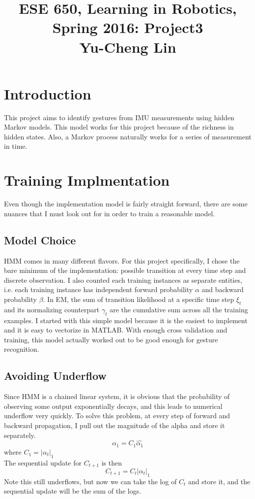 \documentclass[english]{article}
\title{ESE 650, Learning in Robotics, Spring 2016: Project3 \\
Yu-Cheng Lin}
\date{}
\begin{document}
\maketitle
\section*{Introduction}
This project aims to identify gestures from IMU measurements using hidden Markov models. This model works for this project because of the richness in hidden states. Also, a Markov process naturally works for a series of measurement in time.
\section*{Training Implmentation}
Even though the implementation model is fairly straight forward, there are some nuances that I must look out for in order to train a reasonable model.
\subsection{Model Choice}
HMM comes in many different flavors. For this project specifically, I chose the bare minimum of the implementation: possible transition at every time step and discrete observation. I also counted each training instances as separate entities, i.e. each training instance has independent forward probability $\alpha$ and backward probability $\beta$. In EM, the sum of transition likelihood at a specific time step $\xi_t$ and its normalizing counterpart $\gamma_t$ are the cumulative sum across all the training examples. I started with this simple model because it is the easiest to implement and it is easy to vectorize in MATLAB. With enough cross validation and training, this model actually worked out to be good enough for gesture recognition.
\subsection{Avoiding Underflow}
Since HMM is a chained linear system, it is obvious that the probability of observing some output exponentially decays, and this leads to numerical underflow very quickly. To solve this problem, at every step of forward and backward propagation, I pull out the magnitude of the alpha and store it separately.
\[
\alpha_1 = C_1 \hat{\alpha_1}
\] where $C_1 = |\alpha_t|_1$\\
The sequential update for $C_{t+1}$ is then 
\[
C_{t+1} = C_t |\alpha_t|_1
\]
Note this still underflows, but now we can take the log of $C_t$ and store it, and the sequential update will be the sum of the logs.\\
\end{document}
